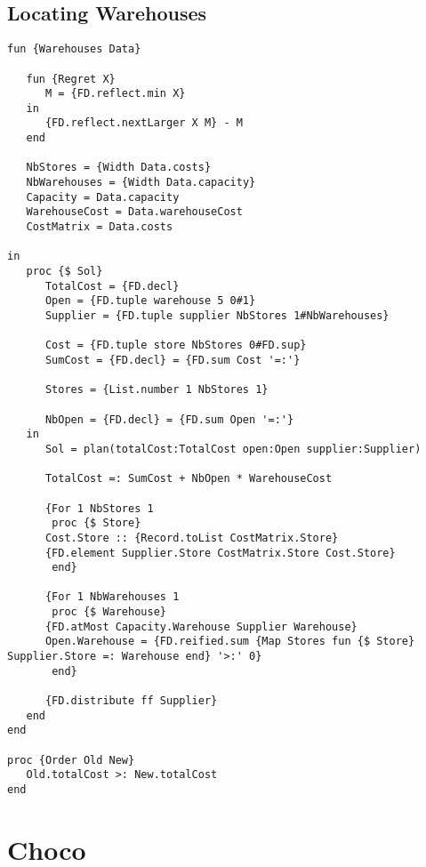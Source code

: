 \subsection{Locating Warehouses}
\begin{lstlisting}[language=Oz]
fun {Warehouses Data}
   
   fun {Regret X}
      M = {FD.reflect.min X}
   in
      {FD.reflect.nextLarger X M} - M
   end

   NbStores = {Width Data.costs}
   NbWarehouses = {Width Data.capacity}
   Capacity = Data.capacity
   WarehouseCost = Data.warehouseCost
   CostMatrix = Data.costs
   
in
   proc {$ Sol}
      TotalCost = {FD.decl}
      Open = {FD.tuple warehouse 5 0#1}
      Supplier = {FD.tuple supplier NbStores 1#NbWarehouses}

      Cost = {FD.tuple store NbStores 0#FD.sup}
      SumCost = {FD.decl} = {FD.sum Cost '=:'}

      Stores = {List.number 1 NbStores 1}

      NbOpen = {FD.decl} = {FD.sum Open '=:'}
   in
      Sol = plan(totalCost:TotalCost open:Open supplier:Supplier)

      TotalCost =: SumCost + NbOpen * WarehouseCost

      {For 1 NbStores 1
       proc {$ Store}
	  Cost.Store :: {Record.toList CostMatrix.Store}
	  {FD.element Supplier.Store CostMatrix.Store Cost.Store}
       end}

      {For 1 NbWarehouses 1
       proc {$ Warehouse}
	  {FD.atMost Capacity.Warehouse Supplier Warehouse}
	  Open.Warehouse = {FD.reified.sum {Map Stores fun {$ Store} Supplier.Store =: Warehouse end} '>:' 0}
       end}
      
      {FD.distribute ff Supplier}
   end
end

proc {Order Old New}
   Old.totalCost >: New.totalCost
end
\end{lstlisting}

\section{Choco}